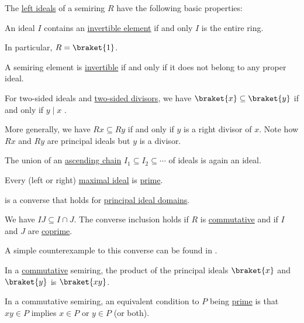\begin{proposition}\label{thm:def:semiring_ideal}
  The \hyperref[def:semiring_ideal]{left ideals} of a semiring \( R \) have the following basic properties:
  \begin{thmenum}
     An ideal \( I \) contains an \hyperref[def:divisibility/invertible]{invertible element} if and only \( I \) is the entire ring.

    In particular, \( R = \braket{ 1 } \).

     A semiring element is \hyperref[def:divisibility/invertible]{invertible} if and only if it does not belong to any proper ideal.

     For two-sided ideals and \hyperref[def:divisibility]{two-sided divisors}, we have \( \braket{ x } \subseteq \braket{ y } \) if and only if \( y \mid x \) .

    More generally, we have \( Rx \subseteq Ry \) if and only if \( y \) is a right divisor of \( x \). Note how \( Rx \) and \( Ry \) are  principal ideals but \( y \) is a  divisor.

     The union of an \hyperref[def:stabilizing_chain]{ascending chain} \( I_1 \subseteq I_2 \subseteq \cdots \) of ideals is again an ideal.

     Every (left or right) \hyperref[def:semiring_ideal/maximal]{maximal ideal} is \hyperref[def:semiring_ideal/prime]{prime}.

     is a converse that holds for \hyperref[def:principal_ideal_domain]{principal ideal domains}.

     We have \( IJ \subseteq I \cap J \). The converse inclusion holds if \( R \) is \hyperref[def:semiring/commutative]{commutative} and if \( I \) and \( J \) are \hyperref[def:semiring_ideal/coprime]{coprime}.

    A simple counterexample to this converse can be found in .

     In a \hyperref[def:semiring/commutative]{commutative} semiring, the product of the principal ideals \( \braket{x} \) and \( \braket{y} \) is \( \braket{xy} \).

     In a commutative semiring, an equivalent condition to \( P \) being \hyperref[def:semiring_ideal/prime]{prime} is that \( xy \in P \) implies \( x \in P \) or \( y \in P \) (or both).
  \end{thmenum}
\end{proposition}

